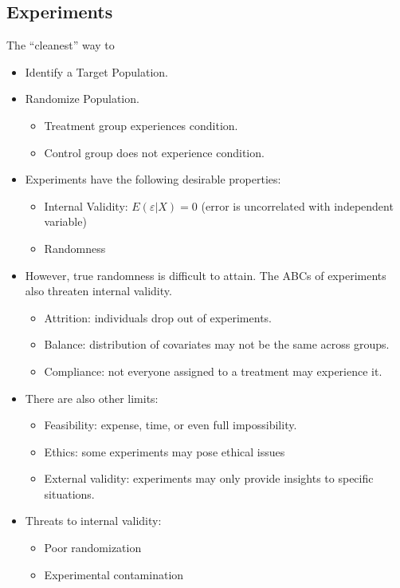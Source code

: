 \documentclass[10pt]{extarticle}
\begin{document}
  \subsection{Experiments}%
  The ``cleanest'' way to 
  \begin{itemize}
    \item Identify a Target Population.
    \item Randomize Population.
      \begin{itemize}
        \item Treatment group experiences condition.
        \item Control group does not experience condition.
      \end{itemize}
    \item Experiments have the following desirable properties:
      \begin{itemize}
        \item Internal Validity: $E(\varepsilon|X) = 0$ (error is uncorrelated with independent variable)
        \item Randomness
      \end{itemize}
    \item However, true randomness is difficult to attain. The ABCs of experiments also threaten internal validity.
      \begin{itemize}
        \item Attrition: individuals drop out of experiments.
        \item Balance: distribution of covariates may not be the same across groups.
        \item Compliance: not everyone assigned to a treatment may experience it.
      \end{itemize}
    \item There are also other limits:
      \begin{itemize}
        \item Feasibility: expense, time, or even full impossibility.
        \item Ethics: some experiments may pose ethical issues
        \item External validity: experiments may only provide insights to specific situations.
      \end{itemize}
    \item Threats to internal validity:
      \begin{itemize}
        \item Poor randomization
        \item Experimental contamination

\end{itemize}
\end{itemize}
\end{document}
